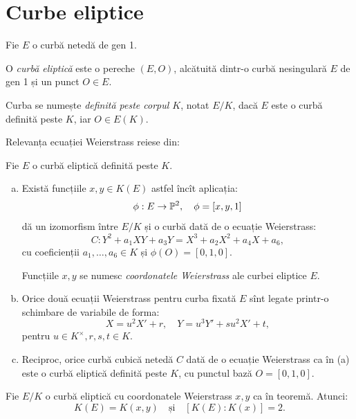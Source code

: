 \section{Curbe eliptice}

Fie $ E $ o curbă netedă de gen 1.

\begin{definition}\label{def:curba-el}
    O \emph{curbă eliptică} este o pereche $ (E, O) $, alcătuită dintr-o
    curbă nesingulară $ E $ de gen 1 și un punct $ O \in E $.

    Curba se numește \emph{definită peste corpul $ K $}, notat $ E/K $,
    dacă $ E $ este o curbă definită peste $ K $, iar $ O \in E(K) $.
\end{definition}

Relevanța ecuației Weierstrass reiese din:
\begin{proposition}\label{prop:weierstrass-eliptic}
    Fie $ E $ o curbă eliptică definită peste $ K $.
    \begin{enumerate}[(a)]
        \item Există funcțiile $ x, y \in K(E) $ astfel încît aplicația:
            \[
                \phi : E \to \mathbb{P}^2, \quad \phi = [x, y, 1]
            \]
           dă un izomorfism între $ E/K $ și o curbă dată de o ecuație Weierstrass:
           \[
               C : Y^2 + a_1 XY + a_3 Y = X^3 + a_2 X^2 + a_4 X + a_6,
           \]
           cu coeficienții $ a_1, \dots, a_6 \in K $ și $ \phi(O) = [0, 1, 0] $.

           Funcțiile $ x, y $ se numesc \emph{coordonatele Weierstrass} ale
           curbei eliptice $ E $.
       \item Orice două ecuații Weierstrass pentru curba fixată $ E $ sînt
           legate printr-o schimbare de variabile de forma:
           \[
                 X = u^2 X' + r, \quad Y = u^3 Y' + su^2 X' + t,
           \]
           pentru $ u \in K^\times, r, s, t \in K $.
       \item Reciproc, orice curbă cubică netedă $ C $ dată de o ecuație
           Weierstrass ca în (a) este o curbă eliptică definită peste $ K $,
           cu punctul bază $ O = [0, 1, 0] $.
    \end{enumerate}
\end{proposition}

\begin{corollary}\label{cor:weier-eliptic}
    Fie $ E/K $ o curbă eliptică cu coordonatele Weierstrass $ x, y $ ca în
    teoremă. Atunci:
    \[
        K(E) = K(x, y) \quad \text{și} \quad [K(E) : K(x)] = 2.
    \]
\end{corollary}

